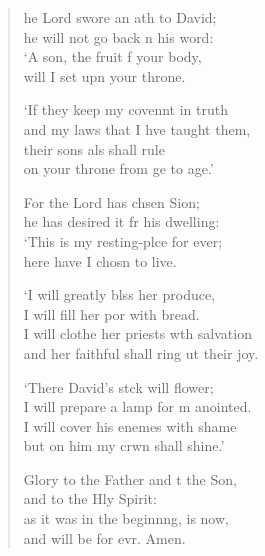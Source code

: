 \settowidth{\versewidth}{I will clothe her priests with salvation *}
\begin{verse}%
  \begin{patverse}
he Lord swore an ath to David;\Med\\
    he will not go back n his word:\\
‘A son, the fruit f your body,\Med\\
    will I set upn your throne.

‘If they keep my covennt in truth\Med\\
    and my laws that I hve taught them,\\
their sons als shall rule\Med\\
    on your throne from ge to age.’

For the Lord has chsen Sion;\Med\\
    he has desired it fr his dwelling:\\
‘This is my resting-plce for ever;\Med\\
    here have I chosn to live.

‘I will greatly blss her produce,\Med\\
    I will fill her por with bread.\\
I will clothe her priests w\pointup{\i}th salvation\Med\\
    and her faithful shall ring ut their joy.

‘There David’s stck will flower;\Med\\
    I will prepare a lamp for m anointed.\\
I will cover his enem\pointup{\i}es with shame\Med\\
    but on him my crwn shall shine.’

Glory to the Father and t the Son,\Med\\
    and to the Hly Spirit:\\
as it was in the beginn\pointup{\i}ng, is now,\Med\\
    and will be for evr. Amen.
  \end{patverse}
\end{verse}
